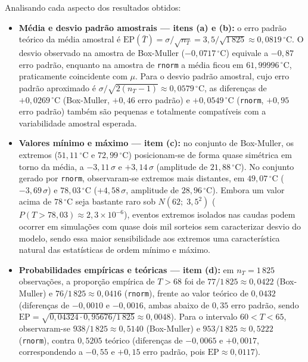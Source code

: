\documentclass[10pt,a4paper]{article}
\begin{document}
Analisando cada aspecto dos resultados obtidos:
\begin{itemize}
    \item \textbf{Média e desvio padrão amostrais — itens (a) e (b):} o erro padrão teórico da média amostral é $\text{EP}(\bar{T}) = \sigma / \sqrt{n_T} = 3{,}5 / \sqrt{1\,825} \approx 0{,}0819\,^\circ\text{C}$. O desvio observado na amostra de Box-Muller ($-0{,}0717\,^\circ\text{C}$) equivale a $-0{,}87$ erro padrão, enquanto na amostra de \texttt{rnorm} a média ficou em $61{,}99996\,^\circ\text{C}$, praticamente coincidente com $\mu$. Para o desvio padrão amostral, cujo erro padrão aproximado é $\sigma / \sqrt{2(n_T - 1)} \approx 0{,}0579\,^\circ\text{C}$, as diferenças de $+0{,}0269\,^\circ\text{C}$ (Box-Muller, $+0{,}46$ erro padrão) e $+0{,}0549\,^\circ\text{C}$ (\texttt{rnorm}, $+0{,}95$ erro padrão) também são pequenas e totalmente compatíveis com a variabilidade amostral esperada.
    \item \textbf{Valores mínimo e máximo — item (c):} no conjunto de Box-Muller, os extremos ($51{,}11\,^\circ\text{C}$ e $72{,}99\,^\circ\text{C}$) posicionam-se de forma quase simétrica em torno da média, a $-3{,}11\,\sigma$ e $+3{,}14\,\sigma$ (amplitude de $21{,}88\,^\circ\text{C}$). No conjunto gerado por \texttt{rnorm}, observaram-se extremos mais distantes, em $49{,}07\,^\circ\text{C}$ ($-3{,}69\,\sigma$) e $78{,}03\,^\circ\text{C}$ ($+4{,}58\,\sigma$, amplitude de $28{,}96\,^\circ\text{C}$). Embora um valor acima de $78\,^\circ\text{C}$ seja bastante raro sob $N(62;\; 3{,}5^{2})$ ($P(T > 78{,}03) \approx 2{,}3 \times 10^{-6}$), eventos extremos isolados nas caudas podem ocorrer em simulações com quase dois mil sorteios sem caracterizar desvio do modelo, sendo essa maior sensibilidade aos extremos uma característica natural das estatísticas de ordem mínimo e máximo.
    \item \textbf{Probabilidades empíricas e teóricas — item (d):} em $n_T = 1\,825$ observações, a proporção empírica de $T > 68$ foi de $77/1\,825 \approx 0{,}0422$ (Box-Muller) e $76/1\,825 \approx 0{,}0416$ (\texttt{rnorm}), frente ao valor teórico de $0{,}0432$ (diferenças de $-0{,}0010$ e $-0{,}0016$, ambas abaixo de $0{,}35$ erro padrão, sendo $\text{EP} = \sqrt{0{,}04324 \cdot 0{,}95676 / 1\,825} \approx 0{,}0048$). Para o intervalo $60 < T < 65$, observaram-se $938/1\,825 \approx 0{,}5140$ (Box-Muller) e $953/1\,825 \approx 0{,}5222$ (\texttt{rnorm}), contra $0{,}5205$ teórico (diferenças de $-0{,}0065$ e $+0{,}0017$, correspondendo a $-0{,}55$ e $+0{,}15$ erro padrão, pois $\text{EP} \approx 0{,}0117$).

\end{itemize}
\end{document}

